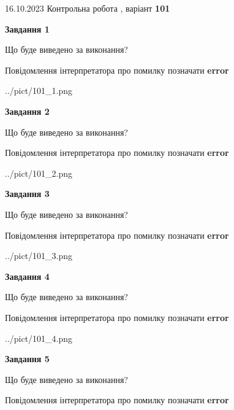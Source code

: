 \documentclass[12pt, ukrainian]{article}
\begin{document}
{\Large{16.10.2023 Контрольна робота , варіант  \No \textbf { 101 }\par}}
{
\begin {large}
{\begin {center}\textbf{Завдання 1}\end {center}}\par
Що буде виведено за виконання? \par
Повідомлення інтерпретатора про помилку позначати \textbf{error}

\begin{center}
	{../pict/101_1.png}
\end{center}
\newpage

{\begin {center}\textbf{Завдання 2}\end {center}}\par
Що буде виведено за виконання? \par
Повідомлення інтерпретатора про помилку позначати \textbf{error}

\begin{center}
	{../pict/101_2.png}
\end{center}
\newpage

{\begin {center}\textbf{Завдання 3}\end {center}}\par
Що буде виведено за виконання? \par
Повідомлення інтерпретатора про помилку позначати \textbf{error}

\begin{center}
	{../pict/101_3.png}
\end{center}
\newpage

{\begin {center}\textbf{Завдання 4}\end {center}}\par
Що буде виведено за виконання? \par
Повідомлення інтерпретатора про помилку позначати \textbf{error}

\begin{center}
	{../pict/101_4.png}
\end{center}
\newpage

{\begin {center}\textbf{Завдання 5}\end {center}}\par
Що буде виведено за виконання? \par
Повідомлення інтерпретатора про помилку позначати \textbf{error}


\end{large}}
\end{document}
